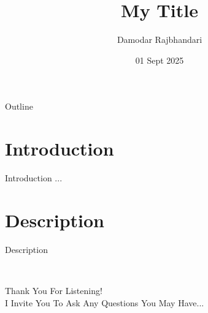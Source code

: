 \documentclass[10pt]{beamer}
\title{My Title}
\author{Damodar Rajbhandari}
\institute{University}
\date{01 Sept 2025}
\begin{document}
\begin{frame}
\titlepage
\end{frame}

\begin{frame}{Outline}
  \tableofcontents
\end{frame}


\section{Introduction}
\begin{frame}{Introduction}
...
\end{frame}

\section{Description}
\begin{frame}{Description}

\end{frame}

\begin{frame}{~}
\begin{center}
{\color{structure!90}
Thank You For Listening!\\
I Invite You To Ask Any Questions You May Have...}\\
\end{center}
\end{frame}

%
%
\end{document}
